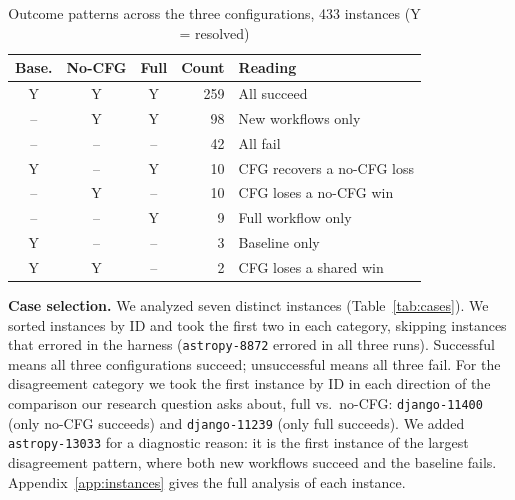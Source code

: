 \documentclass[conference]{IEEEtran}
\begin{document}
\begin{table}[htbp]
\caption{Outcome patterns across the three configurations, 433 instances (Y = resolved)}
\label{tab:paired}
\centering
\begin{tabular}{@{}cccrl@{}}
\toprule
\textbf{Base.} & \textbf{No-CFG} & \textbf{Full} & \textbf{Count} & \textbf{Reading} \\
\midrule
Y & Y & Y & 259 & All succeed \\
-- & Y & Y & 98 & New workflows only \\
-- & -- & -- & 42 & All fail \\
Y & -- & Y & 10 & CFG recovers a no-CFG loss \\
-- & Y & -- & 10 & CFG loses a no-CFG win \\
-- & -- & Y & 9 & Full workflow only \\
Y & -- & -- & 3 & Baseline only \\
Y & Y & -- & 2 & CFG loses a shared win \\
\bottomrule
\end{tabular}
\end{table}

\textbf{Case selection.} We analyzed seven distinct instances (Table~\ref{tab:cases}). We sorted instances by ID and took the first two in each category, skipping instances that errored in the harness (\texttt{astropy-8872} errored in all three runs). Successful means all three configurations succeed; unsuccessful means all three fail. For the disagreement category we took the first instance by ID in each direction of the comparison our research question asks about, full vs.\ no-CFG: \texttt{django-11400} (only no-CFG succeeds) and \texttt{django-11239} (only full succeeds). We added \texttt{astropy-13033} for a diagnostic reason: it is the first instance of the largest disagreement pattern, where both new workflows succeed and the baseline fails. Appendix~\ref{app:instances} gives the full analysis of each instance.
\end{document}
